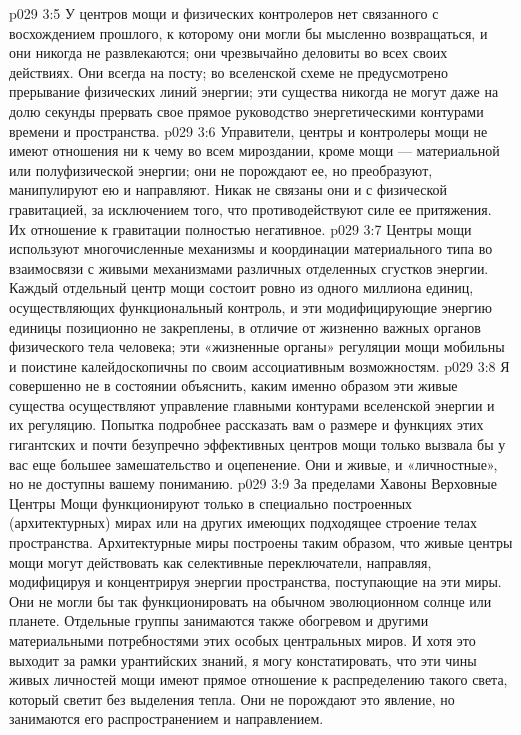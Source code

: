 \vs p029 3:5 У центров мощи и физических контролеров нет связанного с восхождением прошлого, к которому они могли бы мысленно возвращаться, и они никогда не развлекаются; они чрезвычайно деловиты во всех своих действиях. Они всегда на посту; во вселенской схеме не предусмотрено прерывание физических линий энергии; эти существа никогда не могут даже на долю секунды прервать свое прямое руководство энергетическими контурами времени и пространства.
\vs p029 3:6 \pc Управители, центры и контролеры мощи не имеют отношения ни к чему во всем мироздании, кроме мощи --- материальной или полуфизической энергии; они не порождают ее, но преобразуют, манипулируют ею и направляют. Никак не связаны они и с физической гравитацией, за исключением того, что противодействуют силе ее притяжения. Их отношение к гравитации полностью негативное.
\vs p029 3:7 Центры мощи используют многочисленные механизмы и координации материального типа во взаимосвязи с живыми механизмами различных отделенных сгустков энергии. Каждый отдельный центр мощи состоит ровно из одного миллиона единиц, осуществляющих функциональный контроль, и эти модифицирующие энергию единицы позиционно не закреплены, в отличие от жизненно важных органов физического тела человека; эти «жизненные органы» регуляции мощи мобильны и поистине калейдоскопичны по своим ассоциативным возможностям.
\vs p029 3:8 Я совершенно не в состоянии объяснить, каким именно образом эти живые существа осуществляют управление главными контурами вселенской энергии и их регуляцию. Попытка подробнее рассказать вам о размере и функциях этих гигантских и почти безупречно эффективных центров мощи только вызвала бы у вас еще большее замешательство и оцепенение. Они и живые, и «личностные», но не доступны вашему пониманию.
\vs p029 3:9 \pc За пределами Хавоны Верховные Центры Мощи функционируют только в специально построенных (архитектурных) мирах или на других имеющих подходящее строение телах пространства. Архитектурные миры построены таким образом, что живые центры мощи могут действовать как селективные переключатели, направляя, модифицируя и концентрируя энергии пространства, поступающие на эти миры. Они не могли бы так функционировать на обычном эволюционном солнце или планете. Отдельные группы занимаются также обогревом и другими материальными потребностями этих особых центральных миров. И хотя это выходит за рамки урантийских знаний, я могу констатировать, что эти чины живых личностей мощи имеют прямое отношение к распределению такого света, который светит без выделения тепла. Они не порождают это явление, но занимаются его распространением и направлением.
